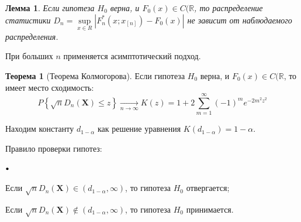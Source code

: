 \documentclass[oneside,final,14pt]{extreport}
\theoremstyle{plain}
\newtheorem*{lem}{Лемма}
\theoremstyle{definition}
\theoremstyle{named}
\newtheorem*{namedthm}{Теорема}
\newcommand\sbullet[1][.5]{\mathbin{\vcenter{\hbox{\scalebox{#1}{$\bullet$}}}}}
\newenvironment{compactlist}{
\begin{list}{{$\sbullet[.75]$}}{
\setlength\partopsep{0pt}
\setlength\parskip{0pt}
\setlength\parsep{0pt}
\setlength\topsep{0pt}
\setlength\itemsep{0pt}
}
}{
\end{list}
}
\begin{document}
\begin{lem}
Если гипотеза $H_0$ верна, и $F_{0}(x) \in C(\mathbb{R}$, то распределение статистики $D_{n}=\sup\limits_{x \in R}\left|F_{n}^{*}\left(x ; x_{[n]}\right)-F_{0}(x)\right|$ не зависит от наблюдаемого распределения.
\end{lem}

При больших $n$ применяется асимптотический подход.
\begin{namedthm}[Теорема Колмогорова]
Если гипотеза $H_0$ верна, и $F_{0}(x) \in C(\mathbb{R}$, то имеет место сходимость:
\begin{equation*}
    P\left\{\sqrt{n} D_{n}\left(\mathbf{X}\right) \leqslant z\right\} \underset{n \rightarrow \infty}{\longrightarrow} K(z)=1+2 \sum_{m=1}^{\infty}(-1)^{m} e^{-2 m^{2} z^{2}}
\end{equation*}
\end{namedthm}

Находим константу $d_{1-\alpha}$ как решение уравнения $K\left(d_{1-\alpha}\right)=1-\alpha$.

Правило проверки гипотез:
\begin{compactlist}
    \item Если $\sqrt{n} D_{n}\left(\mathbf{X}\right) \in\left(d_{1-\alpha}, \infty\right)$, то гипотеза $H_0$ отвергается;
    \item Если $\sqrt{n} D_{n}\left(\mathbf{X}\right) \notin\left(d_{1-\alpha}, \infty\right)$, то гипотеза $H_0$ принимается.
\end{compactlist}
\end{document}
